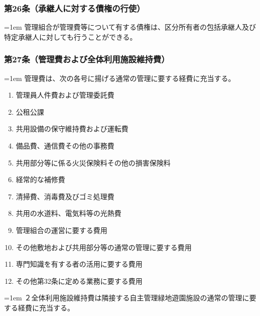 \documentclass[
  twoside,
  luatex,
  paper=a4paper,
  fontsize=11pt,
  jafontsize=11pt,
  jlreq_notes,
]{jlreq}
\newcommand{\joumain}[1]{%
  \noindent\hangindent=1em\hangafter=1
  \hspace{1em}#1%
}
\newcommand{\kou}[2]{%
  \par\noindent\hangindent=1em\hangafter=1
  #1\hspace{1em}#2%
}
\begin{document}
  \subsubsection*{第26条（承継人に対する債権の行使）}
  \joumain{管理組合が管理費等について有する債権は、区分所有者の包括承継人及び特定承継人に対しても行うことができる。}

  \subsubsection*{第27条（管理費および全体利用施設維持費）}
  \joumain{管理費は、次の各号に揚げる通常の管理に要する経費に充当する。}
  \begin{enumerate}
    \item 管理員人件費および管理委託費
    \item 公租公課
    \item 共用設備の保守維持費および運転費
    \item 備品費、通信費その他の事務費
    \item 共用部分等に係る火災保険料その他の損害保険料
    \item 経常的な補修費
    \item 清掃費、消毒費及びゴミ処理費
    \item 共用の水道料、電気料等の光熱費
    \item 管理組合の運営に要する費用
    \item その他敷地および共用部分等の通常の管理に要する費用
    \item 専門知識を有する者の活用に要する費用
    \item その他第32条に定める業務に要する費用
  \end{enumerate}
  \kou{２}{全体利用施設維持費は隣接する自主管理緑地遊園施設の通常の管理に要する経費に充当する。}
\end{document}
